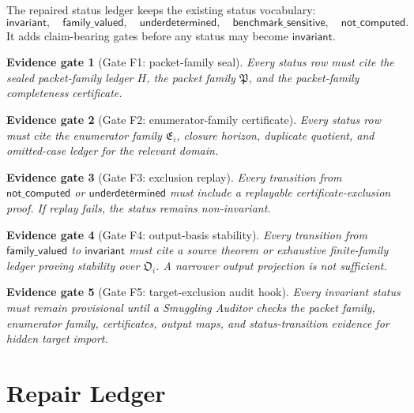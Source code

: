 \documentclass[11pt]{article}
\newcommand{\PackFam}{\mathfrak{P}}
\newcommand{\EnumFam}{\mathfrak{E}}
\newcommand{\OutFam}{\mathfrak{O}}
\newtheorem{evidencegate}{Evidence gate}
\begin{document}
The repaired status ledger keeps the existing status vocabulary:
\[
\mathsf{invariant},\quad
\mathsf{family\_valued},\quad
\mathsf{underdetermined},\quad
\mathsf{benchmark\_sensitive},\quad
\mathsf{not\_computed}.
\]
It adds claim-bearing gates before any status may become
\(\mathsf{invariant}\).

\begin{evidencegate}[Gate F1: packet-family seal]
Every status row must cite the sealed packet-family ledger \(H\), the packet
family \(\PackFam\), and the packet-family completeness certificate.
\end{evidencegate}

\begin{evidencegate}[Gate F2: enumerator-family certificate]
Every status row must cite the enumerator family \(\EnumFam_i\), closure
horizon, duplicate quotient, and omitted-case ledger for the relevant domain.
\end{evidencegate}

\begin{evidencegate}[Gate F3: exclusion replay]
Every transition from \(\mathsf{not\_computed}\) or
\(\mathsf{underdetermined}\) must include a replayable certificate-exclusion
proof. If replay fails, the status remains non-invariant.
\end{evidencegate}

\begin{evidencegate}[Gate F4: output-basis stability]
Every transition from \(\mathsf{family\_valued}\) to
\(\mathsf{invariant}\) must cite a source theorem or exhaustive finite-family
ledger proving stability over \(\OutFam_i\). A narrower output projection is
not sufficient.
\end{evidencegate}

\begin{evidencegate}[Gate F5: target-exclusion audit hook]
Every invariant status must remain provisional until a Smuggling Auditor
checks the packet family, enumerator family, certificates, output maps, and
status-transition evidence for hidden target import.
\end{evidencegate}

\section{Repair Ledger}
\end{document}
